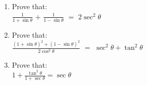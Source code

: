  \begin{enumerate}
	 \item Prove that:\\
		 $\frac{1}{1 + \sin\theta}$ $+$ $\frac{1}{1 - \sin\theta}$ $=$ $2\sec^{2}\theta$
	 \item Prove that:\\
		 $\frac{(1 + \sin\theta)^{2} + (1 - \sin\theta)^{2}}{2\cos^{2}\theta}$ $=$ $\sec^{2}\theta + \tan^{2}\theta $
	 \item Prove that:\\
		 $1 + \frac{\tan^{2}\theta}{1 + \sec\theta} = \sec\theta$
 \end{enumerate}
